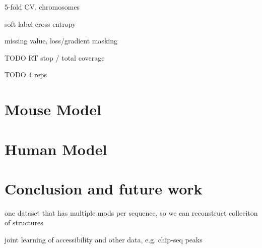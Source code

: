 \documentclass{proposal}
\begin{document}

5-fold CV, chromosomes

soft label cross entropy

missing value, loss/gradient masking

TODO RT stop / total coverage

TODO 4 reps

\chapter{Mouse Model}


\chapter{Human Model}

\chapter{Conclusion and future work}

one dataset that has multiple mods per sequence, so we can reconstruct colleciton of structures

joint learning of accessibility and other data, e.g. chip-seq peaks




\end{document}
